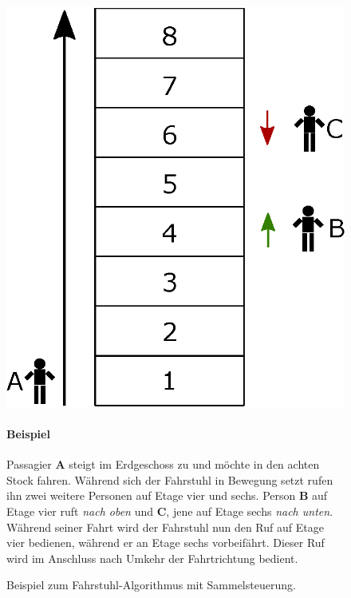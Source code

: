 \hspace*{1cm}
\begin{figure}[h!]
	\begin{minipage}{0.47\textwidth}
		\includegraphics[width=\textwidth]{images/algo_example.eps}
	\end{minipage}
	\hfill
	\begin{minipage}{0.47\textwidth}
		\paragraph{Beispiel}
		Passagier \textbf{A} steigt im Erdgeschoss zu und möchte in den achten Stock fahren. Während sich der Fahrstuhl in Bewegung setzt rufen ihn zwei weitere Personen auf Etage vier und sechs. Person \textbf{B} auf Etage vier ruft \textit{nach oben} und \textbf{C}, jene auf Etage sechs \textit{nach unten}.\\
		Während seiner Fahrt wird der Fahrstuhl nun den Ruf auf Etage vier bedienen, während er an Etage sechs vorbeifährt. Dieser Ruf wird im Anschluss nach Umkehr der Fahrtrichtung bedient.
	\end{minipage}
	\caption{Beispiel zum Fahrstuhl-Algorithmus mit Sammel\-steuerung.}
	\label{algo_exam}
\end{figure}

